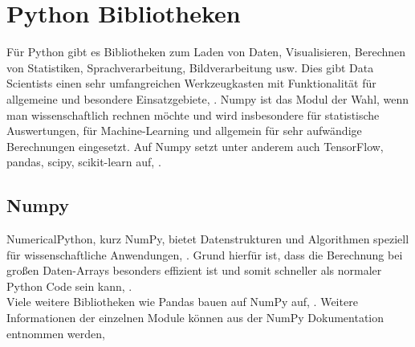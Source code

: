 \chapter{Python Bibliotheken}

Für Python gibt es Bibliotheken zum Laden von Daten, Visualisieren, Berechnen von Statistiken, Sprachverarbeitung, Bildverarbeitung usw. Dies gibt Data Scientists einen sehr umfangreichen Werkzeugkasten mit Funktionalität für allgemeine und besondere Einsatzgebiete, \cite{Mueller:2017}.
Numpy ist das Modul der Wahl, wenn man wissenschaftlich rechnen möchte und wird insbesondere für statistische Auswertungen, für Machine-Learning und allgemein für sehr aufwändige Berechnungen eingesetzt. Auf Numpy setzt unter anderem auch TensorFlow, pandas, scipy, scikit-learn auf, \cite{Häberlein:2024}.

\section{Numpy}
NumericalPython, kurz NumPy, bietet Datenstrukturen und Algorithmen speziell für wissenschaftliche Anwendungen, \cite{McKinney:2023}. Grund hierfür ist, dass die Berechnung bei großen Daten-Arrays besonders effizient ist und somit schneller als normaler Python Code sein kann, \cite{McKinney:2023}. \\
Viele weitere Bibliotheken wie Pandas bauen auf NumPy auf, \cite{VanderPlas:2023}. Weitere Informationen der einzelnen Module können aus der NumPy Dokumentation entnommen werden, \cite{NumPy}

